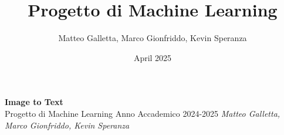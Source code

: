 \documentclass[12pt,a4paper,openany,oneside]{book}
\title{Progetto di Machine Learning}
\author{Matteo Galletta, Marco Gionfriddo, Kevin Speranza}
\date{April 2025}
\begin{document}
\begin{titlepage}
    \centering
    \vspace*{3cm}
    {\Huge \textbf{Image to Text}}\\[1.5cm]
    {\Large Progetto di Machine Learning}
    {\Large Anno Accademico 2024-2025}
    \vfill
    \normalsize{\textit{Matteo Galletta, Marco Gionfriddo, Kevin Speranza}}
\end{titlepage}
\tableofcontents
\newpage
{}









\end{document}
